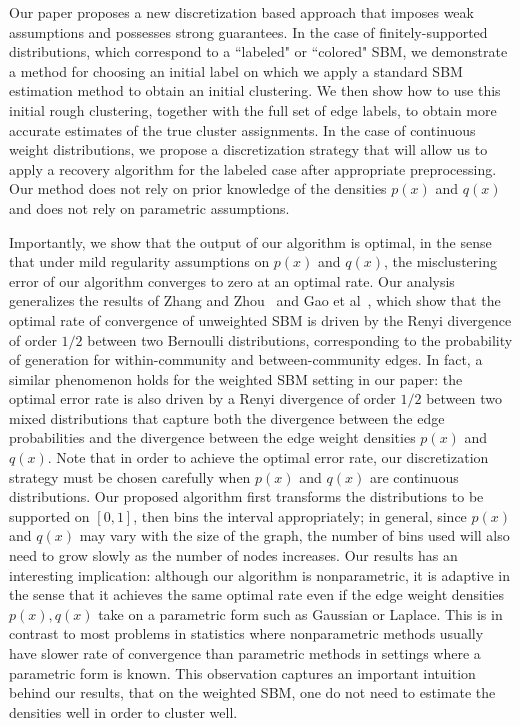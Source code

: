 \documentclass{article}
\begin{document}
Our paper proposes a new discretization based approach that imposes weak assumptions and possesses strong guarantees. In the case of finitely-supported distributions, which correspond to a ``labeled" or ``colored" SBM, we demonstrate a method for choosing an initial label on which we apply a standard SBM estimation method to obtain an initial clustering. We then show how to use this initial rough clustering, together with the full set of edge labels, to obtain more accurate estimates of the true cluster assignments. In the case of continuous weight distributions, we propose a discretization strategy that will allow us to apply a recovery algorithm for the labeled case after appropriate preprocessing. Our method does not rely on prior knowledge of the densities $p(x)$ and $q(x)$ and does not rely on parametric assumptions.

Importantly, we show that the output of our algorithm is optimal, in the sense that under mild regularity assumptions on $p(x)$ and $q(x)$, the misclustering error of our algorithm converges to zero at an optimal rate. Our analysis generalizes the results of Zhang and Zhou~\cite{zhangminimax} and Gao et al~\cite{gao2015achieving}, which show that the optimal rate of convergence of unweighted SBM is driven by the Renyi divergence of order $1/2$ between two Bernoulli distributions, corresponding to the probability of generation for within-community and between-community edges. In fact, a similar phenomenon holds for the weighted SBM setting in our paper: the optimal error rate is also driven by a Renyi divergence of order $1/2$ between two mixed distributions that capture both the divergence between the edge probabilities and the divergence between the edge weight densities $p(x)$ and $q(x)$. Note that in order to achieve the optimal error rate, our discretization strategy must be chosen carefully when $p(x)$ and $q(x)$ are continuous distributions. Our proposed algorithm first transforms the distributions to be supported on $[0,1]$, then bins the interval appropriately; in general, since $p(x)$ and $q(x)$ may vary with the size of the graph, the number of bins used will also need to grow slowly as the number of nodes increases. Our results has an interesting implication: although our algorithm is nonparametric, it is adaptive in the sense that it achieves the same optimal rate even if the edge weight densities $p(x), q(x)$ take on a parametric form such as Gaussian or Laplace. This is in contrast to most problems in statistics where nonparametric methods usually have slower rate of convergence than parametric methods in settings where a parametric form is known. This observation captures an important intuition behind our results, that on the weighted SBM, one do not need to estimate the densities well in order to cluster well.
\end{document}

